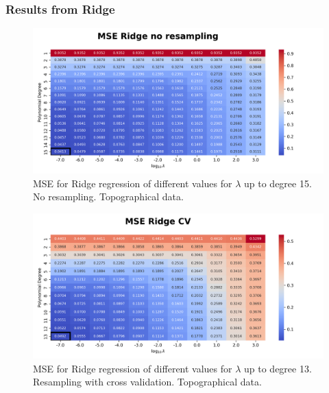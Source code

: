 \documentclass{article}
\begin{document}
\newpage
\subsubsection{Results from Ridge}
\begin{figure}[htbp]
    \centering
    \includegraphics[width=\textwidth]{Project1/figures/Terrain/Heatmap_MSE_Ridge_no_resampling.png}
    \caption{MSE for Ridge regression of different values for $\lambda$ up to degree 15. No resampling. Topographical data.}
    \label{fig:TerrainRidgeNoResamp}
\end{figure}

\begin{figure}[htbp]
    \centering
    \includegraphics[width=\textwidth]{Project1/figures/Terrain/Heatmap_MSE_Ridge_CV.png}
    \caption{MSE for Ridge regression of different values for $\lambda$ up to degree 13. Resampling with cross validation. Topographical data.}
    \label{fig:TerrainRidgeCV}
\end{figure}
\end{document}
